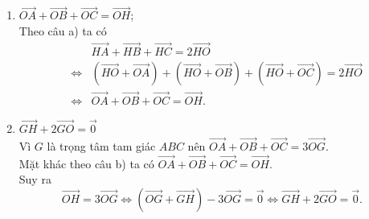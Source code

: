 \begin{bt}
{\begin{enumerate}
			$BH \parallel DC$ (vì cùng vuông góc với $AC$)\\
			$BD\parallel CH$ (vì cùng vuông góc với $AB$)\\
			Suy ra $BDCH$ là hình bình hành, do đó theo quy tắc hình bình hành thì $$\overrightarrow{HB}+\overrightarrow{HC}=\overrightarrow{HD} \quad \quad (1)$$ 
			Mặt khác vì $O$ là trung điểm của $AD$ nên $\overrightarrow{HA}+\overrightarrow{HD}=2\overrightarrow{HO}$ \quad \quad (2)\\
			Từ (1) và (2) suy ra $\overrightarrow{HA}+\overrightarrow{HB}+\overrightarrow{HC}=2\overrightarrow{HO}$.   
			\item $\overrightarrow{OA}+\overrightarrow{OB}+\overrightarrow{OC}=\overrightarrow{OH}$;\\
			Theo câu a) ta có
			\begin{eqnarray*}
				& &  \overrightarrow{HA}+\overrightarrow{HB}+\overrightarrow{HC}=2\overrightarrow{HO}\\
				&\Leftrightarrow& \left(\overrightarrow{HO}+\overrightarrow{OA}\right)+\left(\overrightarrow{HO}+\overrightarrow{OB}\right)+\left(\overrightarrow{HO}+\overrightarrow{OC}\right)=2\overrightarrow{HO}  \\
				&\Leftrightarrow& \overrightarrow{OA}+\overrightarrow{OB}+\overrightarrow{OC}=\overrightarrow{OH}.
			\end{eqnarray*}
			\item $\overrightarrow{GH}+2\overrightarrow{GO}=\overrightarrow 0 $\\
			Vì $G$ là trọng tâm tam giác $ABC$ nên $\overrightarrow{OA}+\overrightarrow{OB}+\overrightarrow{OC}=3\overrightarrow{OG}$.\\
			Mặt khác theo câu b) ta có $\overrightarrow{OA}+\overrightarrow{OB}+\overrightarrow{OC}=\overrightarrow{OH}$.\\
			Suy ra $$\overrightarrow{OH}=3\overrightarrow{OG}\Leftrightarrow\left(\overrightarrow{OG}+\overrightarrow{GH}\right)-3\overrightarrow{OG}=\overrightarrow 0\Leftrightarrow\overrightarrow{GH}+2\overrightarrow{GO}=\overrightarrow 0 .$$
		\end{enumerate}
	}
\end{bt}

